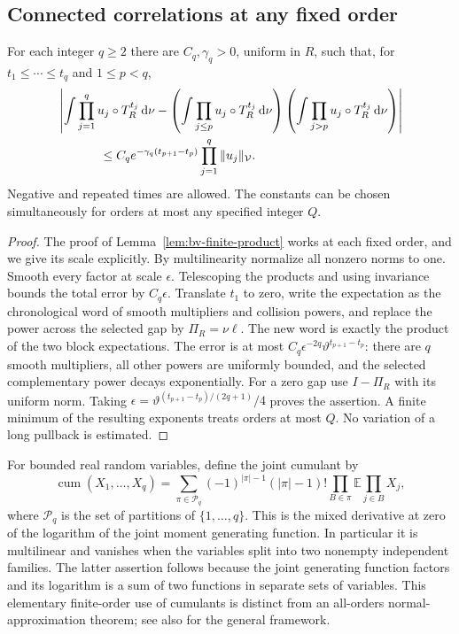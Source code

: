 \subsection{Connected correlations at any fixed order}
\begin{lemma}
\label{lem:all-finite-product}
For each integer $q\ge2$ there are $C_q,\gamma_q>0$, uniform in $R$,
such that, for $t_1\le\cdots\le t_q$ and $1\le p<q$,
\begin{align}
 &\left|\int\prod_{j=1}^q u_j\circ T_R^{t_j}\dd\nu
 -\left(\int\prod_{j\le p}u_j\circ T_R^{t_j}\dd\nu\right)
  \left(\int\prod_{j>p}u_j\circ T_R^{t_j}\dd\nu\right)\right|
 \notag\\
 &\hspace{12mm}\le C_qe^{-\gamma_q(t_{p+1}-t_p)}
                         \prod_{j=1}^q\|u_j\|_{\mathcal V}.
 \label{eq:all-finite-product}
\end{align}
Negative and repeated times are allowed. The constants can be chosen
simultaneously for orders at most any specified integer $Q$.
\end{lemma}
\begin{proof}
The proof of Lemma~\ref{lem:bv-finite-product} works at each fixed
order, and we give its scale explicitly. By multilinearity normalize
all nonzero norms to one. Smooth every factor at scale $\epsilon$.
Telescoping the products and using invariance bounds the total error
by $C_q\epsilon$. Translate $t_1$ to zero, write the expectation as
the chronological word of smooth multipliers and collision powers,
and replace the power across the selected gap by $\Pi_R=\nu\ell$.
The new word is exactly the product of the two block expectations.
The error is at most $C_q\epsilon^{-2q}\vartheta^{t_{p+1}-t_p}$:
there are $q$ smooth multipliers, all other powers are uniformly
bounded, and the selected complementary power decays exponentially.
For a zero gap use $I-\Pi_R$ with its uniform norm. Taking
$\epsilon=\vartheta^{(t_{p+1}-t_p)/(2q+1)}/4$ proves the assertion.
A finite minimum of the resulting exponents treats orders at most $Q$.
No variation of a long pullback is estimated.
\end{proof}

For bounded real random variables, define the joint cumulant by
\begin{equation}\label{eq:finite-order-cumulant-definition}
 \operatorname{cum}(X_1,\ldots,X_q)
 =\sum_{\pi\in\mathcal P_q}(-1)^{|\pi|-1}(|\pi|-1)!
                    \prod_{B\in\pi}\mathbb E\prod_{j\in B}X_j,
\end{equation}
where $\mathcal P_q$ is the set of partitions of $\{1,\ldots,q\}$.
This is the mixed derivative at zero of the logarithm of the joint
moment generating function. In particular it is multilinear and
vanishes when the variables split into two nonempty independent
families. The latter assertion follows because the joint generating
function factors and its logarithm is a sum of two functions in
separate sets of variables. This elementary finite-order use of
cumulants is distinct from an all-orders normal-approximation theorem;
see also \cite{DJS} for the general framework.

